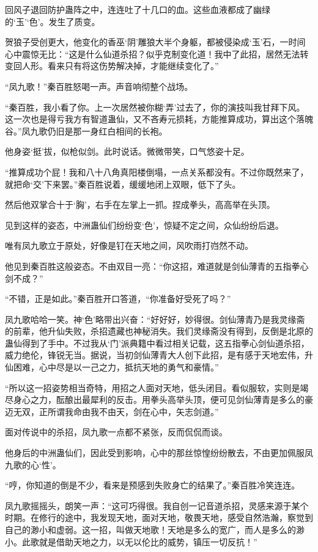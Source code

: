 \begin{this_body}
回风子退回防护蛊阵之中，连连吐了十几口的血。这些血液都成了幽绿的‘玉’‘色’。发生了质变。

贺狼子受创更大，他变化的香巫‘阴’雕狼大半个身躯，都被侵染成‘玉’石，一时间心中震惊无比：“这是什么仙道杀招？似乎克制变化道！我中了此招，居然无法转变回人形。看来只有将这伤势解决掉，才能继续变化了。”

“凤九歌！”秦百胜怒喝一声。声音响彻整个战场。

“秦百胜，我小看了你。上一次居然被你糊‘弄’过去了，你的演技叫我甘拜下风。这一次也是得亏我方有智道蛊仙，又不吝寿元损耗，方能推算成功，算出这个落魄谷。”凤九歌仍旧是那一身红白相间的长袍。

他身姿‘挺’拔，似枪似剑。此时说话。微微带笑，口气悠姿十足。

“推算成功个屁！我和八十八角真阳楼倒塌，一点关系都没有。不过你既然来了，就把命‘交’下来罢。”秦百胜说着，缓缓地闭上双眼，低下了头。

然后他双掌合十于‘胸’，右手在左掌上一抓。捏成拳头，高高举在头顶。

见到这样的姿态，中洲蛊仙们纷纷变‘色’，惊疑不定之间，众仙纷纷后退。

唯有凤九歌立于原处，好像是钉在天地之间，风吹雨打岿然不动。

他见到秦百胜这般姿态。不由双目一亮：“你这招，难道就是剑仙薄青的五指拳心剑不成？”

“不错，正是如此。”秦百胜开口答道，“你准备好受死了吗？”

凤九歌哈哈一笑。神‘色’略带出兴奋：“好好好，妙得很。剑仙薄青乃是我灵缘斋的前辈，他升仙失败，杀招遗藏也神秘消失。我们灵缘斋没有得到，反倒是北原的蛊仙得到了手中。不过我从‘门’派典籍中看过相关记载，这五指拳心剑仙道杀招，威力绝伦，锋锐无当。据说，当初剑仙薄青大人创下此招，是有感于天地宏伟，升仙困难，心中尽是以一己之力，抵抗天地的勇气和豪情。”

“所以这一招姿势相当奇特，用招之人面对天地，低头闭目。看似服软，实则是竭尽身心之力，酝酿出最犀利的反击。用拳头高举头顶，便可见剑仙薄青是多么的豪迈无双，正所谓我命由我不由天，剑在心中，矢志剑道。”

面对传说中的杀招，凤九歌一点都不紧张，反而侃侃而谈。

他身后的中洲蛊仙们，因此受到影响，心中的那丝惊惶纷纷散去，不由更加佩服凤九歌的心‘性’。

“哼，你知道的倒是不少，看来是预感到失败身亡的结果了。”秦百胜冷笑连连。

凤九歌摇摇头，朗笑一声：“这可巧得很。我自创一记音道杀招，灵感来源于某个时期。在修行的途中，我发现天地，面对天地，敬畏天地，感受自然浩瀚，察觉到自己的渺小和虚弱。这一招，叫做天地歌！天地是多么的宽广，而人是多么的渺小。此歌就是借助天地之力，以无以伦比的威势，镇压一切反抗！”


\end{this_body}
